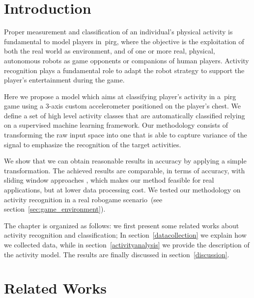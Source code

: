 \section{Introduction} %

Proper measurement and classification of an individual's physical  activity is fundamental to %
model players in~\gls{pirg}, where the objective is the exploitation of both the real world as environment, and of one or more real, physical, autonomous robots as game opponents or companions of human players. Activity recognition plays a fundamental role to adapt the robot strategy to support the player's entertainment during the game.

Here we propose a model which aims at classifying player's activity in a~\gls{pirg} game using a 3-axis custom accelerometer positioned on the player's chest. We define a set of high level activity classes that are automatically classified relying on a supervised machine learning framework. Our methodology consists of transforming the raw input space into one that is able to capture variance of the signal to emphasize the recognition of the target activities. 

We show that we can obtain reasonable results in accuracy by applying a simple transformation. The achieved results are comparable, in terms of accuracy, with sliding window approaches %
, which makes our method feasible for real applications, but at lower data processing cost. We tested our methodology on activity recognition in a real robogame scenario~(see section~\ref{sec:game_environment}). 

The chapter is organized as follows: we first present some related works about activity recognition and classification; In section~\ref{datacollection} we explain how we collected data, while in section~\ref{activityanalysis} we provide the description of the activity model. The results are finally discussed in section~\ref{discussion}.

\section{Related Works}\label{relatedworks} %

